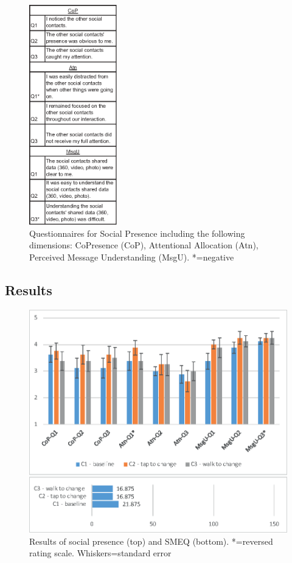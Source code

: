 \begin{figure}[ht]
    \centering
    \includegraphics[width=1.5in]{images/chi/images-02.eps}
    \caption{Questionnaires for Social Presence including the following dimensions: CoPresence (CoP), Attentional Allocation (Atn), Perceived Message Understanding (MsgU). *=negative} 
      \label{tbl:questions}
\end{figure}

\subsection{Results}

\begin{figure}[h]
  \centering
  \includegraphics[width=\columnwidth]{images/chi/images-01.eps}
  \caption{Results of social presence (top) and SMEQ (bottom). *=reversed rating scale. Whiskers=standard error}
  \label{fig:data:results}
\end{figure}

